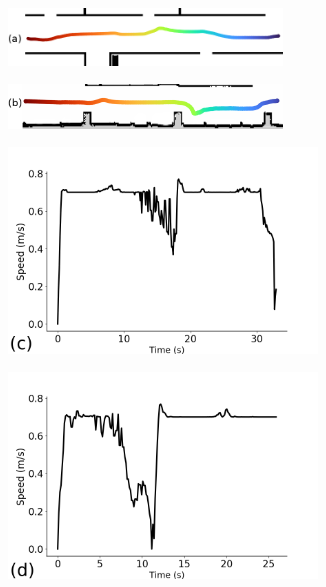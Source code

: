 \begin{figure}[b!]
\begin{subfigure}{\columnwidth}
  \centering
  \includegraphics[width=0.8\textwidth]{images/chapter5/corridor_path_new.png}
\end{subfigure}
\hspace{-0.17cm}
\begin{subfigure}{\columnwidth}
  \centering
  \includegraphics[width=0.8\textwidth]{images/chapter5/pillar_new.png} 
\end{subfigure}
\begin{subfigure}{0.45\columnwidth}
  \centering
  \includegraphics[width=0.9\textwidth]{images/chapter5/vel_corridor_new.png}
\end{subfigure}
\hspace{-0.17cm}
\begin{subfigure}{0.45\columnwidth}
  \centering
  \includegraphics[width=0.9\textwidth]{images/chapter5/vel_pillar_new.png} 

\end{subfigure}
\end{figure}
